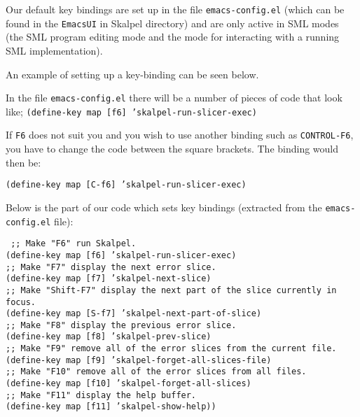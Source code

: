 \documentclass{report}
\begin{document}
Our default key bindings are set up in the file
\texttt{emacs-config.el} (which can be found in the
\texttt{EmacsUI} in Skalpel directory) and are only
active in SML modes (the SML program editing mode and the mode for
interacting with a running SML implementation).


\medskip
An example of setting up a key-binding can be seen below.

In the file \texttt{emacs-config.el} there will be a number of
pieces of code that look like;
\texttt{(define-key map [f6] 'skalpel-run-slicer-exec)}

If \texttt{F6} does not suit you and you wish to use another
binding such as \texttt{CONTROL-F6}, you have to change the
code between the square brackets.  The binding would then be:

\texttt{(define-key map [C-f6] 'skalpel-run-slicer-exec)}

\medskip
Below is the part of our code which sets key bindings (extracted from
the \texttt{emacs-config.el} file):

\texttt{
  ;; Make "F6" run Skalpel.\\
  (define-key map [f6] 'skalpel-run-slicer-exec)\\
  ;; Make "F7" display the next error slice.\\
  (define-key map [f7] 'skalpel-next-slice)\\
  ;; Make "Shift-F7" display the next part of the slice currently in focus.\\
  (define-key map [S-f7] 'skalpel-next-part-of-slice)\\
  ;; Make "F8" display the previous error slice.\\
  (define-key map [f8] 'skalpel-prev-slice)\\
  ;; Make "F9" remove all of the error slices from the current file.\\
  (define-key map [f9] 'skalpel-forget-all-slices-file)\\
  ;; Make "F10" remove all of the error slices from all files.\\
  (define-key map [f10] 'skalpel-forget-all-slices)\\
  ;; Make "F11" display the help buffer.\\
  (define-key map [f11] 'skalpel-show-help))
}
\end{document}

